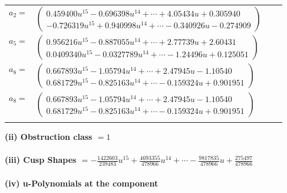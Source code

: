 \documentclass[1p]{elsarticle_modified}
\theoremstyle{definition}
\begin{document}
\begin{tabular}{m{7pt} m{180pt} m{7pt} m{180pt} }
\flushright $a_{2}=$&$\begin{pmatrix}0.459400 u^{15}-0.696398 u^{14}+\cdots+4.05434 u+0.305940\\-0.726319 u^{15}+0.940998 u^{14}+\cdots-0.340926 u-0.274909\end{pmatrix}$ \\
\flushright $a_{5}=$&$\begin{pmatrix}0.956216 u^{15}-0.887055 u^{14}+\cdots+2.77739 u+2.60431\\0.0409340 u^{15}-0.0327789 u^{14}+\cdots-1.24496 u+0.125051\end{pmatrix}$ \\
\flushright $a_{8}=$&$\begin{pmatrix}0.667893 u^{15}-1.05794 u^{14}+\cdots+2.47945 u-1.10540\\0.681729 u^{15}-0.825163 u^{14}+\cdots-0.159324 u+0.901951\end{pmatrix}$\\ \flushright $a_{8}=$&$\begin{pmatrix}0.667893 u^{15}-1.05794 u^{14}+\cdots+2.47945 u-1.10540\\0.681729 u^{15}-0.825163 u^{14}+\cdots-0.159324 u+0.901951\end{pmatrix}$\\&\end{tabular}
\flushleft \textbf{(ii) Obstruction class $= 1$}\\~\\
\flushleft \textbf{(iii) Cusp Shapes $= -\frac{1422603}{239483} u^{15}+\frac{4693355}{478966} u^{14}+\cdots-\frac{9817835}{478966} u+\frac{275497}{478966}$}\\~\\
\newpage\renewcommand{\arraystretch}{1}
\flushleft \textbf{(iv) u-Polynomials at the component}\newline \\
\end{document}
